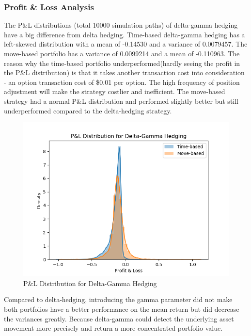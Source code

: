 \documentclass[12pt]{article}
\begin{document}
\subsubsection{Profit \& Loss Analysis}
The P\&L distributions (total 10000 simulation paths) of delta-gamma hedging have a big difference from delta hedging. Time-based delta-gamma hedging has a left-skewed distribution with a mean of -0.14530 and a variance of 0.0079457. The move-based portfolio has a variance of 0.0099214 
and a mean of -0.110963. The reason why the time-based portfolio underperformed(hardly seeing the profit in the P\&L distribution) is that it takes another transaction cost into consideration - an option transaction cost of \$0.01 per option. The high frequency of position adjustment will 
make the strategy costlier and inefficient. The move-based strategy had a normal P\&L distribution and performed slightly better but still underperformed compared to the delta-hedging strategy. 

\begin{figure}[H]
  \centering
  \includegraphics[scale=0.8]{PnLDistributionforDeltaGammaHedging.png}
  \caption[P\&L Distribution for Delta-Gamma Hedging]{P\&L Distribution for Delta-Gamma Hedging}
\end{figure}

\noindent 
Compared to delta-hedging, introducing the gamma parameter did not make both portfolios have a better performance on the mean return but did decrease the variances greatly. Because delta-gamma could detect the underlying asset movement more precisely and return a more concentrated portfolio value.
\end{document}
